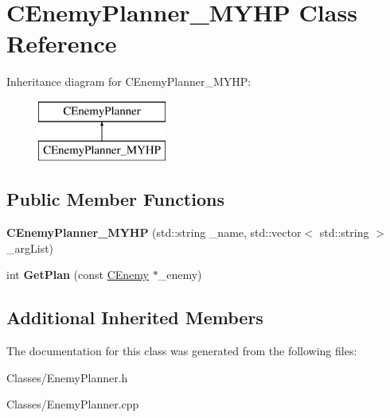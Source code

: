 \hypertarget{class_c_enemy_planner___m_y_h_p}{}\section{C\+Enemy\+Planner\+\_\+\+M\+Y\+HP Class Reference}
\label{class_c_enemy_planner___m_y_h_p}
Inheritance diagram for C\+Enemy\+Planner\+\_\+\+M\+Y\+HP\+:\begin{figure}[H]
\begin{center}
\leavevmode
\includegraphics[height=2.000000cm]{class_c_enemy_planner___m_y_h_p}
\end{center}
\end{figure}
\subsection*{Public Member Functions}
\begin{DoxyCompactItemize}
\item 
{\bfseries C\+Enemy\+Planner\+\_\+\+M\+Y\+HP} (std\+::string \+\_\+name, std\+::vector$<$ std\+::string $>$ \+\_\+arg\+List)\hypertarget{class_c_enemy_planner___m_y_h_p_afe0ecb2d463f28d5db23f5aed233a1c0}{}\label{class_c_enemy_planner___m_y_h_p_afe0ecb2d463f28d5db23f5aed233a1c0}

\item 
int {\bfseries Get\+Plan} (const \hyperlink{class_c_enemy}{C\+Enemy} $\ast$\+\_\+enemy)\hypertarget{class_c_enemy_planner___m_y_h_p_a274c0f95bcdf2539f011f323a6241cdd}{}\label{class_c_enemy_planner___m_y_h_p_a274c0f95bcdf2539f011f323a6241cdd}

\end{DoxyCompactItemize}
\subsection*{Additional Inherited Members}


The documentation for this class was generated from the following files\+:\begin{DoxyCompactItemize}
\item 
Classes/Enemy\+Planner.\+h\item 
Classes/Enemy\+Planner.\+cpp\end{DoxyCompactItemize}
